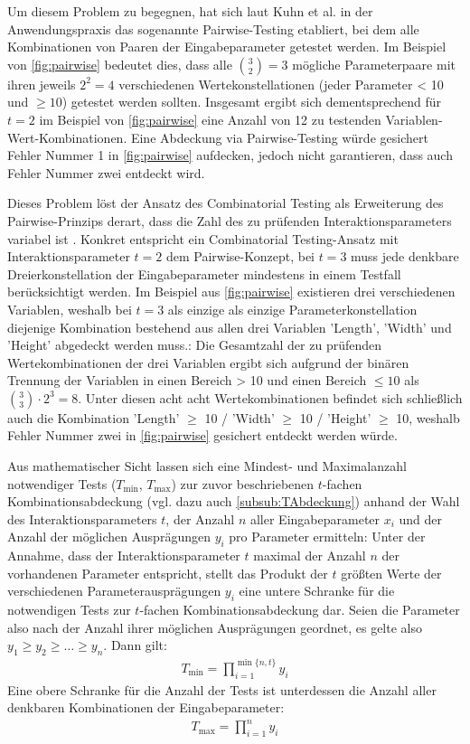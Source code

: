 Um diesem Problem zu begegnen, hat sich laut Kuhn et al. \cite{kuhn2010practical} in der Anwendungspraxis das sogenannte Pairwise-Testing etabliert, bei dem alle Kombinationen von Paaren der Eingabeparameter getestet werden. Im Beispiel von \autoref{fig:pairwise} bedeutet dies, dass alle $\binom{3}{2} = 3$ mögliche Parameterpaare mit ihren jeweils $2^2 = 4$ verschiedenen Wertekonstellationen (jeder Parameter < 10 und $\geq 10$) getestet werden sollten. Insgesamt ergibt sich dementsprechend für $t=2$ im Beispiel von \autoref{fig:pairwise} eine Anzahl von 12 zu testenden Variablen-Wert-Kombinationen. Eine Abdeckung via Pairwise-Testing würde gesichert Fehler Nummer 1 in \autoref{fig:pairwise} aufdecken, jedoch nicht garantieren, dass auch Fehler Nummer zwei entdeckt wird.

Dieses Problem löst der Ansatz des Combinatorial Testing als Erweiterung des Pairwise-Prinzips derart, dass die Zahl des zu prüfenden Interaktionsparameters variabel ist \cite{kuhn2010practical}. Konkret entspricht ein Combinatorial Testing-Ansatz mit Interaktionsparameter $t=2$ dem Pairwise-Konzept, bei $t=3$ muss jede denkbare Dreierkonstellation der Eingabeparameter mindestens in einem Testfall berücksichtigt werden. Im Beispiel aus \autoref{fig:pairwise} existieren drei verschiedenen Variablen, weshalb bei $t=3$ als einzige als einzige Parameterkonstellation diejenige Kombination bestehend aus allen drei Variablen 'Length', 'Width' und 'Height' abgedeckt werden muss.: Die Gesamtzahl der zu prüfenden Wertekombinationen der drei Variablen ergibt sich aufgrund der binären Trennung der Variablen in einen Bereich > 10 und einen Bereich $\leq 10$ als $\binom{3}{3} \cdot 2^3 = 8$. Unter diesen acht acht Wertekombinationen befindet sich schließlich auch die Kombination 'Length' $\geq$ 10 / 'Width' $\geq$ 10 / 'Height' $\geq$ 10, weshalb Fehler Nummer zwei in \autoref{fig:pairwise} gesichert entdeckt werden würde.

Aus mathematischer Sicht lassen sich eine Mindest- und Maximalanzahl notwendiger Tests ($T_{\min}$, $T_{\max}$) zur zuvor beschriebenen $t$-fachen Kombinationsabdeckung (vgl. dazu auch \autoref{subsub:TAbdeckung}) anhand der Wahl des Interaktionsparameters $t$, der Anzahl $n$ aller Eingabeparameter $x_i$ und der Anzahl der möglichen Ausprägungen $y_i$ pro Parameter ermitteln: Unter der Annahme, dass der Interaktionsparameter $t$ maximal der Anzahl $n$ der vorhandenen Parameter entspricht, stellt das Produkt der $t$ größten Werte der verschiedenen Parameterausprägungen $y_i$ eine untere Schranke für die notwendigen Tests zur $t$-fachen Kombinationsabdeckung dar. Seien die Parameter also nach der Anzahl ihrer möglichen Ausprägungen geordnet, es gelte also $y_1 \geq y_2 \geq \dots \geq y_n$. Dann gilt:
\begin{gather}
T_{\min} = \prod_{i = 1}^{\min\{n,t\}} y_i
\end{gather}
Eine obere Schranke für die Anzahl der Tests ist unterdessen die Anzahl aller denkbaren Kombinationen der Eingabeparameter:
\begin{gather}
T_{\max} = \prod_{i=1}^{n} y_i
\end{gather}

